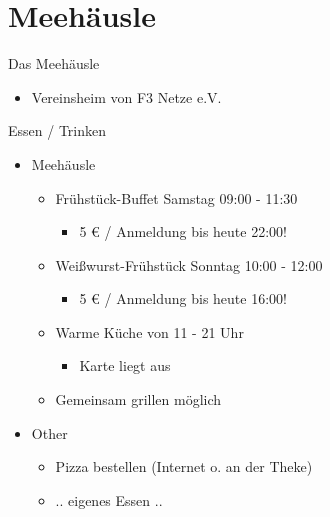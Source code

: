 \section{Meehäusle}

\begin{frame}{Das Meehäusle}
    \begin{itemize}
        \item Vereinsheim von F3 Netze e.V.
    \end{itemize}
\end{frame}

\begin{frame}{Essen / Trinken}
    \begin{itemize}
        \item Meehäusle
        \begin{itemize}
            \item Frühstück-Buffet Samstag 09:00 - 11:30
            \begin{itemize}
                \item 5 € / Anmeldung bis heute 22:00!
            \end{itemize}
            \item Weißwurst-Frühstück Sonntag 10:00 - 12:00
            \begin{itemize}
                \item 5 € / Anmeldung bis heute 16:00!
            \end{itemize}
            \item Warme Küche von 11 - 21 Uhr
            \begin{itemize}
                \item Karte liegt aus
            \end{itemize}
            \item Gemeinsam grillen möglich
        \end{itemize}
        \item Other
        \begin{itemize}
            \item Pizza bestellen (Internet o. an der Theke)
            \item .. eigenes Essen ..
        \end{itemize}
    \end{itemize}
\end{frame}

